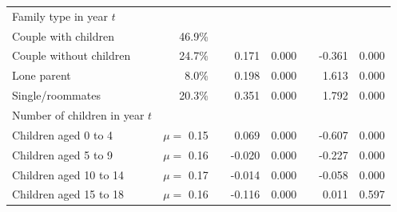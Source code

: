 \begin{table}[H]
\begin{tabular}{lrrrrrrr}
		Family type in year $t$                     &         &  &                          &                       &                      &                          &                       \\
		\hspace{2mm} Couple with children                      & 46.9\%  &  &                          &                       &                      &                          &                       \\
		\hspace{2mm} Couple without children           & 24.7\%  &  & 0.171                    & 0.000                 &                      & -0.361                   & 0.000                 \\
		\hspace{2mm} Lone parent           & 8.0\%   &  & 0.198                    & 0.000                 &                      & 1.613                    & 0.000                 \\
		\hspace{2mm} Single/roommates              & 20.3\%  &  & 0.351                    & 0.000                 &                      & 1.792                    & 0.000                 \\
		Number of children in year $t$              &         &  &                          &                       &                      &                          &                       \\
		\hspace{2mm} Children aged 0 to 4                      & $\mu = $ 0.15    &  & 0.069                    & 0.000                 &                      & -0.607                   & 0.000                 \\
		\hspace{2mm} Children aged 5 to 9                      & $\mu = $ 0.16    &  & -0.020                   & 0.000                 &                      & -0.227                   & 0.000                 \\
		\hspace{2mm} Children aged 10 to 14                    & $\mu = $ 0.17    &  & -0.014                   & 0.000                 &                      & -0.058                   & 0.000                 \\
		\hspace{2mm} Children aged 15 to 18                    & $\mu = $ 0.16    &  & -0.116                   & 0.000                 &                      & 0.011                    & 0.597                 \\

\end{tabular}
\end{table}
